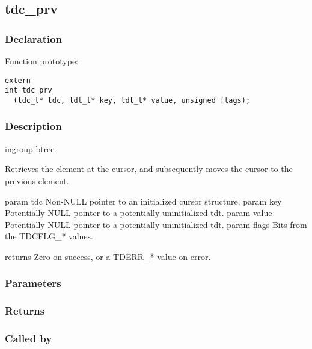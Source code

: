 
\newpage
\subsection{tdc\_prv}
\subsubsection{Declaration} Function prototype:

\begin{verbatim}
extern
int tdc_prv
  (tdc_t* tdc, tdt_t* key, tdt_t* value, unsigned flags);
\end{verbatim}

\subsubsection{Description}


 ingroup btree

 Retrieves the element at the cursor, and subsequently moves the cursor
 to the previous element.

 param tdc Non-NULL pointer to an initialized cursor structure.
 param key Potentially NULL pointer to a potentially uninitialized tdt.
 param value Potentially NULL pointer to a potentially uninitialized tdt.
 param flags Bits from the TDCFLG\_* values.

 returns Zero on success, or a TDERR\_* value on error.
 

\subsubsection{Parameters}
\subsubsection{Returns}
\subsubsection{Called by}
